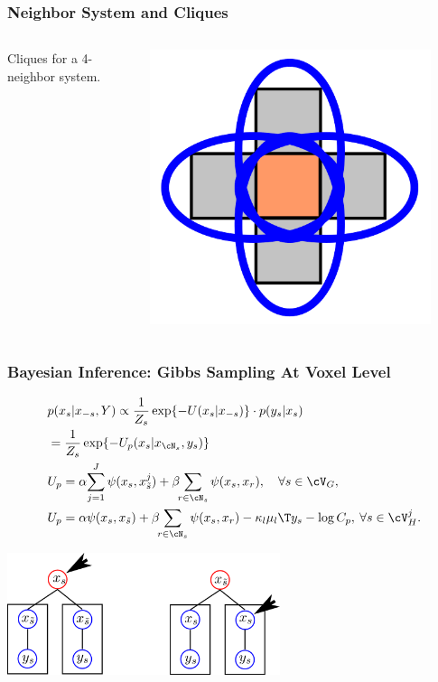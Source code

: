 \documentclass[serif]{beamer}
\begin{document}
\begin{frame}
  \frametitle{Neighbor System and Cliques}
  \begin{columns}[c]
    \begin{column}{6cm}
      Cliques for a 4-neighbor system.
      \end{column}

    \begin{column}{5cm}
      \includegraphics[width=0.9\textwidth]{sfig/clique_1}
    \end{column}
    \end{columns}
\end{frame}


\begin{frame}
  \frametitle{Bayesian Inference: Gibbs Sampling At Voxel Level}
  \begin{block}{}
    \begin{align*}
&p(x_s | x_{-s},Y) \propto \frac{1}{Z_s}\exp\{-U(x_s | x_{-s})\} \cdot p(y_s | x_s) \\
&= \frac{1}{Z_s}\exp\{-U_p(x_s | x_{\cN_s }, y_s)\} \nonumber\\
& U_p = \alpha\!\sum_{j=1}^J \psi(x_s, x_{\tilde s}^j) + \beta\!\!\sum_{r\in \cN_{s}} \psi(x_s,x_r), \quad \forall s \in \cV_G,\\
& U_p = \alpha \psi(x_s,x_{\tilde s}) + \beta\!\!\sum_{r\in \cN_{s}} \psi (x_s, x_r) - \kappa_l \mu_l\T y_s - \log C_p, \: \forall s \in \cV_H^j.
\end{align*}
    \end{block}
  \includegraphics[width=0.6\textwidth]{sfig/voxelgibbs}

\end{frame}
\end{document}
